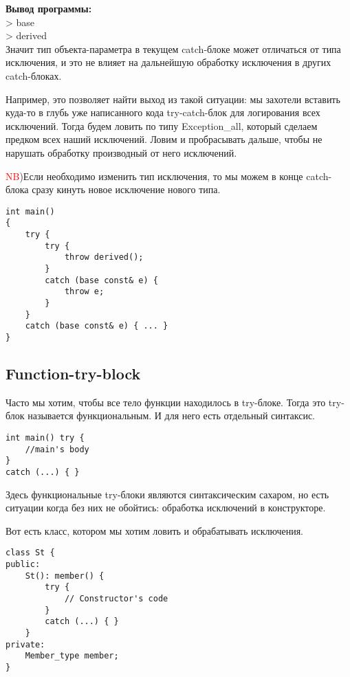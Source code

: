 \textbf{Вывод программы:} \\
> base \\
> derived \\

Значит тип объекта-параметра в текущем catch-блоке может отличаться от типа исключения, и это не влияет на дальнейшую обработку исключения в других catch-блоках.

 Например, это позволяет найти выход из такой ситуации: мы захотели вставить куда-то в глубь уже написанного кода try-catch-блок для логирования всех исключений. Тогда будем ловить по типу Exception\_all, который сделаем предком всех наший исключений. Ловим и пробрасывать дальше, чтобы не нарушать обработку производный от него исключений.

 \textcolor{red}{NB})Если необходимо изменить тип исключения, то мы можем в конце catch-блока сразу кинуть новое исключение нового типа.

\begin{verbatim}
int main()
{
    try {
        try {
            throw derived();
        }
        catch (base const& e) {
            throw e;
        }
    }
    catch (base const& e) { ... }
}
\end{verbatim}

\subsection{Function-try-block}

Часто мы хотим, чтобы все тело функции находилось в try-блоке. Тогда это try-блок называется функциональным. И для него есть отдельный синтаксис.
\begin{verbatim}
int main() try {
    //main's body
}
catch (...) { }
\end{verbatim}

Здесь функциональные try-блоки являются синтаксическим сахаром, но есть ситуации когда без них не обойтись: обработка исключений в конструкторе.

Вот есть класс, котором мы хотим ловить и обрабатывать исключения.
\begin{verbatim}
class St {
public:
    St(): member() {
        try {
            // Constructor's code
        }
        catch (...) { }
    }
private:
    Member_type member;
}
\end{verbatim}

